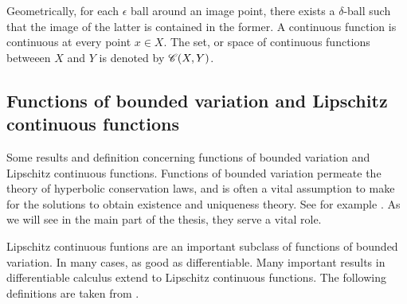 Geometrically, for each $\epsilon$ ball around an image point, there exists a $\delta$-ball such that the image of the latter is contained in the former. A continuous function is continuous at every point $x \in X$. The set, or space of continuous functions betweeen $X$ and $Y$ is denoted by $\mathscr{C}(X,Y)$.

\iffalse
 Let $\Omega \subset \mathscr{R}^n$. One important class is

\begin{equation} \label{C(Rn)}
     \mathscr{C}(\Omega) := \{f : \Omega \rightarrow \mathscr{R} \,|\, \text{f is a continuous function\}.
\end{equation}
If $\Omega$ is compact, a result by SOMEONE, states that every element of $\C$ attains its supremal value, and can be endowed with the supremum norm. Often called the topology of uniform convergence. 

\begin{equation}
    \norm{f}_\infty = sup_{x \in \Omega} |f(x)|.
\end{equation}
By (...), is a banach space, or a complete normed space. 


There are several equivalent definitions and generalisations of continuity, the standard one being a local definition. 
USE DEFINITIONS 

Total variation is a measure of how much a function changes. For a function that takes pointwise values, we have the following definition

\fi 

\subsection{Functions of bounded variation and Lipschitz continuous functions}
Some results and definition concerning functions of bounded variation and Lipschitz continuous functions. Functions of bounded variation permeate the theory of hyperbolic conservation laws, and is often a vital assumption to make for the solutions to obtain existence and uniqueness theory. See for example \cite{holden2015front}. As we will see in the main part of the thesis, they serve a vital role. 

Lipschitz continuous funtions are an important subclass of functions of bounded variation. In many cases, as good as differentiable. Many important results in differentiable calculus extend to Lipschitz continuous functions. The following definitions are taken from \cite{tao2011introduction}. 


